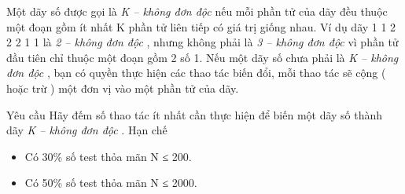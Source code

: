Một dãy số được gọi là   \textit{    K – không đơn độc   }   nếu mỗi phần tử của dãy đều thuộc một đoạn gồm ít nhất       K      phần tử liên tiếp có giá trị giống nhau. Ví dụ dãy 1 1 2 2 2 1 1 là   \textit{    2 – không đơn độc   }   , nhưng không phải là   \textit{    3 – không đơn độc   }   vì phần tử đầu tiên chỉ thuộc một đoạn gồm 2 số 1. Nếu một dãy số chưa phải là   \textit{    K – không đơn độc   }   , bạn có quyền thực hiện các thao tác biến đổi, mỗi thao tác sẽ cộng ( hoặc trừ ) một đơn vị vào một phần tử của dãy.  

Yêu cầu
Hãy đếm số thao tác ít nhất cần thực hiện để biến một dãy số thành dãy   \textit{    K – không đơn độc   }   .
Hạn chế
\begin{itemize}
	\item     Có 30\% số test thỏa mãn N ≤ 200.   
	\item     Có 50\% số test thỏa mãn N ≤ 2000.   
\end{itemize}